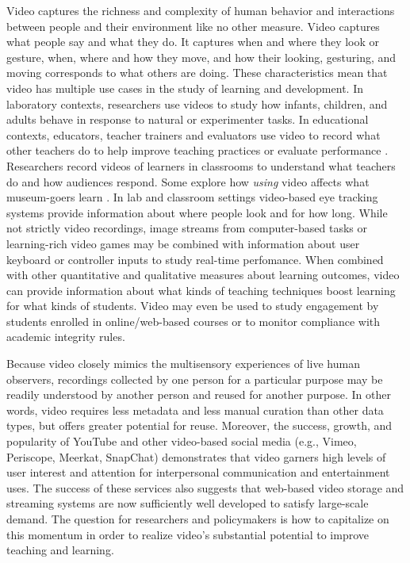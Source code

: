 \documentclass[letterpaper,man,apacite]{apa6}
\begin{document}
Video captures the richness and complexity of human behavior and interactions between people and their environment like no other measure.
Video captures what people say and what they do.
It captures when and where they look or gesture, when, where and how they move, and how their looking, gesturing, and moving corresponds to what others are doing.
These characteristics mean that video has multiple use cases in the study of learning and development.
In laboratory contexts, researchers use videos to study how \cite{Karasik2014} infants, children, and adults behave in response to natural or experimenter tasks.
In educational contexts, educators, teacher trainers and evaluators use video to record what other teachers do to help improve teaching practices or evaluate performance \cite{Blomberg2014, Masats20111151, Baecher2013189}.
Researchers record videos of learners in classrooms \cite{Alibali2012} to understand what teachers do and how audiences respond.
Some explore how \emph{using} video affects what museum-goers learn \cite{Bakken2015}.
In lab \cite{Kretch2014} and classroom \cite{Mason2015, Prieto:2014:STC:2669485.2669543} settings video-based eye tracking systems provide information about where people look and for how long.
While not strictly video recordings, image streams from computer-based tasks or learning-rich video games may be combined with information about user keyboard or controller inputs to study real-time perfomance.
When combined with other quantitative and qualitative measures about learning outcomes, video can provide information about what kinds of teaching techniques boost learning for what kinds of students.
Video may even be used to study engagement by students enrolled in online/web-based courses or to monitor compliance with academic integrity rules.

Because video closely mimics the multisensory experiences of live human observers, recordings collected by one person for a particular purpose may be readily understood by another person and reused for another purpose.
In other words, video requires less metadata and less manual curation than other data types, but offers greater potential for reuse.
Moreover, the success, growth, and popularity of YouTube and other video-based social media (e.g., Vimeo, Periscope, Meerkat, SnapChat) demonstrates that video garners high levels of user interest and attention for interpersonal communication and entertainment uses.
The success of these services also suggests that web-based video storage and streaming systems are now sufficiently well developed to satisfy large-scale demand.
The question for researchers and policymakers is how to capitalize on this momentum in order to realize video's substantial potential to improve teaching and learning. 
\end{document}
